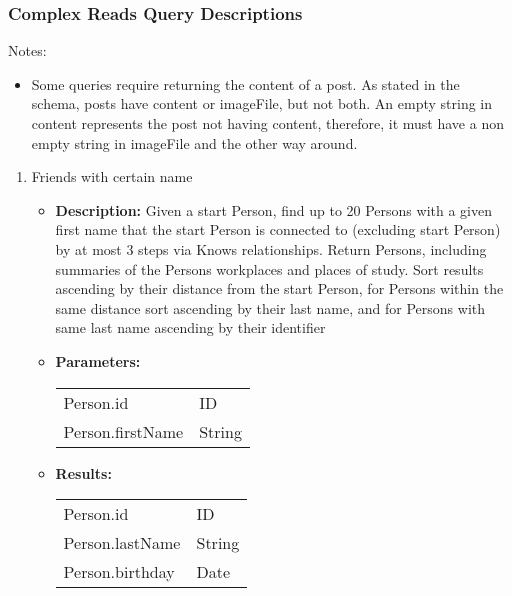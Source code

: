 \subsubsection{Complex Reads Query Descriptions}
\label{sub:queries}

Notes:
\begin{itemize}
    \item Some queries require returning the content of a post. As stated in the
        schema, posts have content or imageFile, but not both. An empty string in
        content represents the post not having content, therefore, it must have a
        non empty string in imageFile and the other way around.
\end{itemize}

{\small
    \begin{enumerate}
        \item Friends with certain name
            \begin{itemize}
                \item \textbf{Description:}
                    Given a start Person, find up to 20 Persons with a given first name
                    that the start Person is connected to (excluding start Person) by
                    at most 3 steps via Knows relationships. Return Persons, including
                    summaries of the Persons workplaces and places of study.  Sort
                    results ascending by their distance from the start Person, for
                    Persons within the same distance sort ascending by their last name,
                    and for Persons with same last name ascending by their identifier
                \item \textbf{Parameters:} \\
                    \begin{tabular}{ll}
                        Person.id 										& ID \\
                        Person.firstName								& String \\
                    \end{tabular}
                \item \textbf{Results:} \\
                    \begin{tabular}{ll}
                        Person.id 										& ID \\
                        Person.lastName									& String \\
                        Person.birthday 								& Date \\

\end{tabular}
\end{itemize}
\end{enumerate}}
